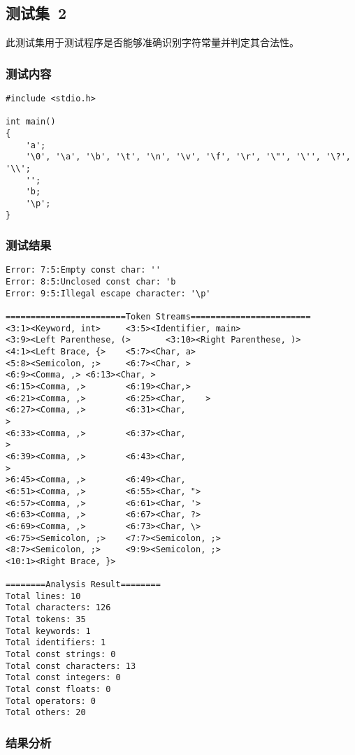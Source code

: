 \documentclass[lang=cn,11pt,a4paper]{paper}
\begin{document}
\subsection{测试集\ 2}

此测试集用于测试程序是否能够准确识别字符常量并判定其合法性。

\subsubsection{测试内容}

\begin{lstlisting}
#include <stdio.h>

int main()
{
    'a';
    '\0', '\a', '\b', '\t', '\n', '\v', '\f', '\r', '\"', '\'', '\?', '\\';
    '';
    'b;
    '\p';
}
\end{lstlisting}

\subsubsection{测试结果}

\begin{lstlisting}
Error: 7:5:Empty const char: ''
Error: 8:5:Unclosed const char: 'b
Error: 9:5:Illegal escape character: '\p'

========================Token Streams========================
<3:1><Keyword, int>     <3:5><Identifier, main>
<3:9><Left Parenthese, (>       <3:10><Right Parenthese, )>
<4:1><Left Brace, {>    <5:7><Char, a>
<5:8><Semicolon, ;>     <6:7><Char, >
<6:9><Comma, ,> <6:13><Char, >
<6:15><Comma, ,>        <6:19><Char,>
<6:21><Comma, ,>        <6:25><Char,    >
<6:27><Comma, ,>        <6:31><Char, 
>
<6:33><Comma, ,>        <6:37><Char, 
>
<6:39><Comma, ,>        <6:43><Char, 
>
>6:45><Comma, ,>        <6:49><Char, 
<6:51><Comma, ,>        <6:55><Char, ">
<6:57><Comma, ,>        <6:61><Char, '>
<6:63><Comma, ,>        <6:67><Char, ?>
<6:69><Comma, ,>        <6:73><Char, \>
<6:75><Semicolon, ;>    <7:7><Semicolon, ;>
<8:7><Semicolon, ;>     <9:9><Semicolon, ;>
<10:1><Right Brace, }>

========Analysis Result========
Total lines: 10
Total characters: 126
Total tokens: 35
Total keywords: 1
Total identifiers: 1
Total const strings: 0
Total const characters: 13
Total const integers: 0
Total const floats: 0
Total operators: 0
Total others: 20
\end{lstlisting}

\subsubsection{结果分析}
\end{document}
